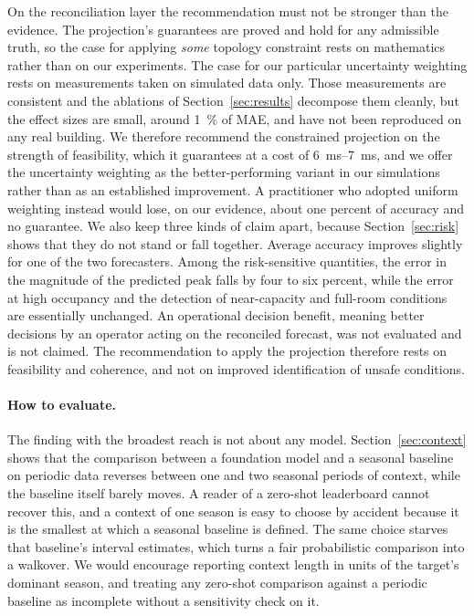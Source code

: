 \documentclass[utf8]{FrontiersinHarvard}
\newif\ifrevisionmarkup
\newcommand{\new}[1]{\ifrevisionmarkup\textcolor{revision}{#1}\else#1\fi}
\newif\ifsecondrevisionmarkup
\newcommand{\rev}[1]{\ifsecondrevisionmarkup\textcolor{revisiontwo}{#1}\else#1\fi}
\theoremstyle{plain}
\theoremstyle{definition}
\theoremstyle{remark}
\begin{document}
\new{On the reconciliation layer \rev{the recommendation must not be stronger than the evidence.} The projection's guarantees are proved and hold for any admissible truth, so the case for applying \emph{some} topology constraint rests on mathematics rather than on our experiments. The case for our particular uncertainty weighting rests on measurements taken on simulated data only. Those measurements are consistent and the ablations of Section~\ref{sec:results} decompose them cleanly, but the effect sizes are small, around \SI{1}{\percent} of \rev{MAE}, and have not been reproduced on any real building. We therefore recommend the constrained projection on the strength of feasibility, which it guarantees at a cost of \SIrange{6}{7}{\milli\second}, and we offer the uncertainty weighting as the better-performing variant in our simulations rather than as an established improvement. A practitioner who adopted uniform weighting instead would lose, on our evidence, about one percent of accuracy and no guarantee. \rev{We also keep three kinds of claim apart, because Section~\ref{sec:risk} shows that they do not stand or fall together. Average accuracy improves slightly for one of the two forecasters. Among the risk-sensitive quantities, the error in the magnitude of the predicted peak falls by four to six percent, while the error at high occupancy and the detection of near-capacity and full-room conditions are essentially unchanged. An operational decision benefit, meaning better decisions by an operator acting on the reconciled forecast, was not evaluated and is not claimed. The recommendation to apply the projection therefore rests on feasibility and coherence, and not on improved identification of unsafe conditions.}}

\paragraph{How to evaluate.}
The finding with the broadest reach is not about any model. Section~\ref{sec:context} shows that the comparison between a foundation model and a seasonal baseline on periodic data reverses between one and two seasonal periods of context, while the baseline itself barely moves. A reader of a zero-shot leaderboard cannot recover this, and a context of one season is easy to choose by accident because it is the smallest at which a seasonal baseline is defined. The same choice starves that baseline's interval estimates, which turns a fair probabilistic comparison into a walkover. We would encourage reporting context length in units of the target's dominant season, and treating any zero-shot comparison against a periodic baseline as incomplete without a sensitivity check on it.
\end{document}
